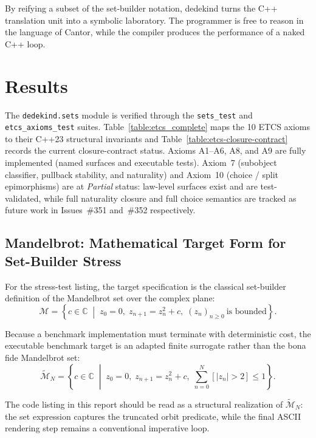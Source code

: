 \documentclass[11pt, a4paper]{report}
\begin{document}
By reifying a subset of the set-builder notation, dedekind turns the C++ translation unit into a symbolic laboratory.
The programmer is free to reason in the language of Cantor, while the compiler produces the performance of a naked C++ loop.

\section{Results}
\label{sec:sets-results}

The \texttt{dedekind.sets} module is verified through the \texttt{sets\_test} and \texttt{etcs\_axioms\_test} suites. Table~\ref{table:etcs_complete} maps the 10 ETCS axioms to their C++23 structural invariants and Table~\ref{table:etcs-closure-contract} records the current closure-contract status. Axioms A1--A6, A8, and A9 are fully implemented (named surfaces and executable tests). Axiom~7 (subobject classifier, pullback stability, and naturality) and Axiom~10 (choice / split epimorphisms) are at \emph{Partial} status: law-level surfaces exist and are test-validated, while full naturality closure and full choice semantics are tracked as future work in Issues~\#351 and~\#352 respectively.

\subsection*{Mandelbrot: Mathematical Target Form for Set-Builder Stress}

For the stress-test listing, the target specification is the classical set-builder definition of the Mandelbrot set over the complex plane:
\begin{equation}
\mathcal{M} = \left\{c \in \mathbb{C} \;\middle|\; z_0 = 0,\; z_{n+1} = z_n^2 + c,\; (z_n)_{n \ge 0}\ \text{is bounded}\right\}.
\end{equation}

Because a benchmark implementation must terminate with deterministic cost, the executable benchmark target is an adapted finite surrogate rather than the bona fide Mandelbrot set:
\begin{equation}
\widetilde{\mathcal{M}}_N = \left\{c \in \mathbb{C} \;\middle|\; z_0 = 0,\; z_{n+1} = z_n^2 + c,\; \sum_{n=0}^{N} [|z_n| > 2] \le 1\right\}.
\end{equation}

The code listing in this report should be read as a structural realization of $\widetilde{\mathcal{M}}_N$: the set expression captures the truncated orbit predicate, while the final ASCII rendering step remains a conventional imperative loop.
\end{document}
